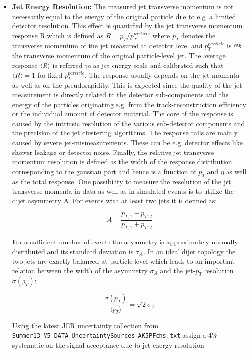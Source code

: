 \begin{itemize}
  \item \textbf{Jet Energy Resolution:}  The measured jet transverse momentum is not necessarily equal to the energy of the original particle due to e.g. a limited detector resolution. This effect is quantified by the jet transverse momentum response R which is defined as $R = p_{T} / p_{T}^{particle}$  where $p_{T}$ denotes the transverse momentum of the jet measured at detector level and $p_{T}^{particle}$ is ￼the transverse momentum of the original particle-level jet. The average response $\langle R \rangle$ is referred to as jet energy scale and calibrated such that $\langle R \rangle = 1$ for fixed $p_{T}^{particle}$. The response usually depends on the jet momenta as well as on the pseudorapidity. This is expected since the quality of the jet measurement is directly related to the detector sub-components and the energy of the particles originating e.g. from the track-reconstruction efficiency or the individual amount of detector material. The core of the response is caused by the intrinsic resolution of the various sub-detector components and the precision of the jet clustering algorithms. The response tails are mainly caused by severe jet-mismeasurements. These can be e.g. detector effects like shower leakage or detector noise. Finally, the relative jet transverse momentum resolution is defined as the width of the response distribution corresponding to the gaussian part and hence is a function of $p_{T}$ and $\eta$ as well as the total response. One possibility to measure the resolution of the jet transverse momenta in data as well as in simulated events is to utilize the dijet asymmetry A. For events with at least two jets it is defined as:
  
  \begin{equation}
  A = \frac{p_{T,1} - p_{T,2}}{p_{T,1} + p_{T,2}}
  \end{equation}
  
  For a sufficient number of events the asymmetry is approximately normally distributed and its standard deviation is $\sigma_{A}$. In an ideal dijet topology the two jets are exactly balanced at particle level which leads to an important relation between the width of the asymmetry $\sigma_{A}$ and the jet-$p_{T}$ resolution $\sigma(p_{T})$:
  
  \begin{equation}
  \frac{\sigma(p_{T})}{\langle p_{T} \rangle} = \sqrt{2} \sigma_{A}
  \end{equation}
  
  Using the latest JER uncertainty collection from \texttt{Summer13\_\-V5\_DATA\_\-Uncertainty\-Sources\_\-AK5PFchs.txt} assign a 4\% systematic on the signal acceptance due to jet energy resolution. 


\end{itemize}
